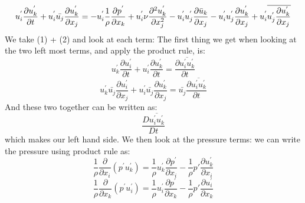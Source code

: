 \documentclass[a4paper,norsk]{article}
\begin{document}
\begin{equation}
u_i^{'}\frac{\partial u^{'}_k}{\partial t} + u_i^{'}\bar{u_j} \frac{\partial u^{'}_k}{\partial x_j} = - u_i^{'}\frac{1}{\rho}\frac{\partial p^{'}} {\partial x_k} + u_i^{'}\nu \frac{\partial^2 u^{'}_k} {\partial x_j^2} - u_i^{'}u^{'}_j \frac{\partial \bar{u}_k}{\partial x_j} - u_i^{'}u^{'}_j \frac{\partial u^{'}_k}{\partial x_j}  + u_i^{'}\overline{u^{'}_j \frac{\partial u^{'}_k}{\partial x_j}}   \\
\end{equation}
We take (1) + (2) and look at each term:
The first thing we get when looking at the two left most terms, and apply the product rule, is: 
$$   u_k^{'}\frac{\partial u^{'}_i}{\partial t} +   u_i^{'}\frac{\partial u^{'}_k}{\partial t} = \frac{\partial \overline{u_i^{'}u_k^{'}}}{\partial t} $$
$$ u_k^{'}\bar{u_j} \frac{\partial u^{'}_i}{\partial x_j}  + u_i^{'}\bar{u_j} \frac{\partial u^{'}_k}{\partial x_j} = \bar{u_j}\frac{\partial \overline{u_i^{'}u_k^{'}}}{\partial t}  $$
And these two together can be written as:
$$ \frac{D \overline{u_i^{'}u_k^{'}}}{Dt} $$
which makes our left hand side.
We then look at the pressure terms:
we can write the pressure using product rule as:
$$ \frac{1}{\rho}\frac{\partial}{\partial x_i} (p^{'} u_k^{'}) = \frac{1}{\rho}u_k^{'} \frac{\partial p^{'} }{\partial x_i} - \frac{1}{\rho}p{'} \frac{\partial u_k^{'} }{\partial x_i}    $$
$$ \frac{1}{\rho}\frac{\partial}{\partial x_k} (p^{'} u_i^{'}) = \frac{1}{\rho}u_i^{'} \frac{\partial p^{'} }{\partial x_k} - \frac{1}{\rho}p{'} \frac{\partial u_i^{'} }{\partial x_k}    $$
\end{document}
